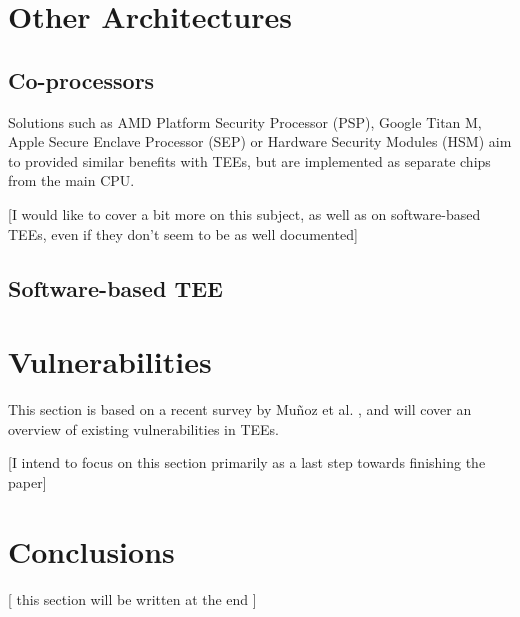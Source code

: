 \documentclass[runningheads,a4paper]{uwsese}
\begin{document}
\section{Other Architectures}


\subsection{Co-processors}

Solutions such as AMD Platform Security Processor (PSP), Google Titan M, Apple
Secure Enclave Processor (SEP) or Hardware Security Modules (HSM) aim to
provided similar benefits with TEEs, but are implemented as separate chips from
the main CPU.

[I would like to cover a bit more on this subject, as well as on software-based TEEs,
even if they don't seem to be as well documented]

\subsection{Software-based TEE}

\section{Vulnerabilities}

This section is based on a recent survey by Muñoz et al. \cite{tee_in_securities},
and will cover an overview of existing vulnerabilities in TEEs.

[I intend to focus on this section primarily as a last step towards finishing the paper]

\section{Conclusions}

[ this section will be written at the end ]


\end{document}
